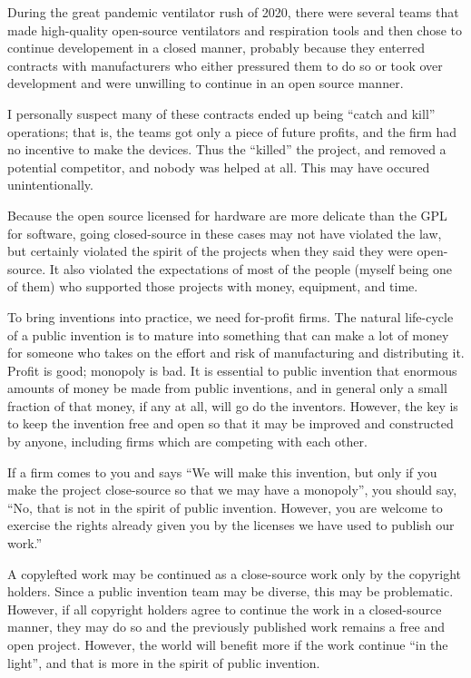 \documentclass[
	fontsize=10pt, %
	twoside=false, %
	secnumdepth=1, %
]{kaobook}
\begin{document}
During the great pandemic ventilator rush of 2020,
there were several teams that made high-quality
open-source ventilators and respiration tools and
then chose to continue developement in a closed manner,
probably because they enterred contracts with manufacturers
who either pressured them to do so or took over development
and were unwilling to continue in an open source manner.

I personally suspect many of these contracts ended
up being ``catch and kill'' operations; that is,
the teams got only a piece of future profits, and
the firm had no incentive to make the devices.
Thus the ``killed'' the project, and removed a potential
competitor, and nobody was helped at all.
This may have occured unintentionally.

Because the open source licensed for hardware are
more delicate than the GPL for software, going
closed-source in these cases may not have violated
the law, but certainly violated the spirit of the
projects when they said they were open-source.
It also violated the expectations of most
of the people (myself being one of them)
who supported those projects with money,
equipment, and time.

To bring inventions into practice, we need
for-profit firms. The natural life-cycle
of a public invention is to mature into
something that can make a lot of money
for someone who takes on the effort and
risk of manufacturing and distributing it.
Profit is good; monopoly is bad.
It is essential to public invention that
enormous amounts of money be made from public inventions,
and in general only a small fraction of that money,
if any at all, will go do the inventors.
However, the key is to keep the invention
free and open so that it may be improved
and constructed by anyone, including firms
which are competing with each other.

If a firm comes to you and says
``We will make this invention, but only
if you make the project close-source so
that we may have a monopoly'', you should
say, ``No, that is not in the spirit of public invention.
However, you are welcome to exercise the rights
already given you by the licenses we have used to
publish our work.''

A copylefted work may be continued as a
close-source work only by the copyright holders.
Since a public invention team may be diverse,
this may be problematic. However, if all copyright
holders agree to continue the work in a closed-source
manner, they may do so and the previously published
work remains a free and open project.
However, the world will benefit more if the
work continue ``in the light'', and that
is more in the spirit of public invention.
\end{document}
